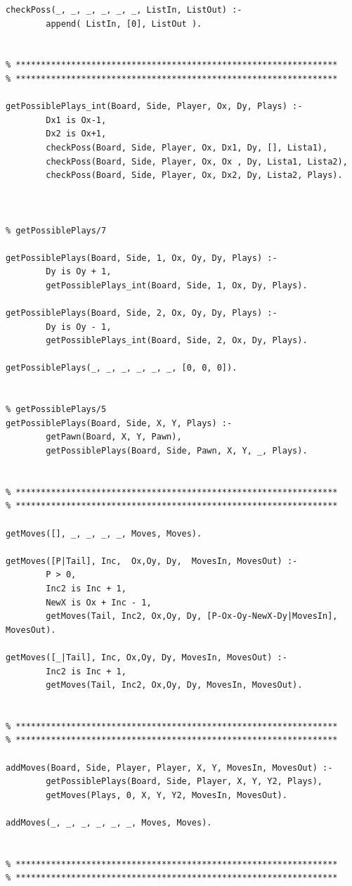 \documentclass[15pt,a4paper]{article}
\begin{document}
\begin{lstlisting}
checkPoss(_, _, _, _, _, _, ListIn, ListOut) :-
		append( ListIn, [0], ListOut ).
		

% ****************************************************************
% ****************************************************************   
		
getPossiblePlays_int(Board, Side, Player, Ox, Dy, Plays) :-
		Dx1 is Ox-1,
		Dx2 is Ox+1,
		checkPoss(Board, Side, Player, Ox, Dx1, Dy, [], Lista1),
		checkPoss(Board, Side, Player, Ox, Ox , Dy, Lista1, Lista2),
		checkPoss(Board, Side, Player, Ox, Dx2, Dy, Lista2, Plays).

		
		
% getPossiblePlays/7		

getPossiblePlays(Board, Side, 1, Ox, Oy, Dy, Plays) :-
		Dy is Oy + 1,
		getPossiblePlays_int(Board, Side, 1, Ox, Dy, Plays).
		
getPossiblePlays(Board, Side, 2, Ox, Oy, Dy, Plays) :-
		Dy is Oy - 1,
		getPossiblePlays_int(Board, Side, 2, Ox, Dy, Plays).
		
getPossiblePlays(_, _, _, _, _, _, [0, 0, 0]).
		

% getPossiblePlays/5
getPossiblePlays(Board, Side, X, Y, Plays) :-
		getPawn(Board, X, Y, Pawn),
		getPossiblePlays(Board, Side, Pawn, X, Y, _, Plays).
		

% ****************************************************************
% ****************************************************************

getMoves([], _, _, _, _, Moves, Moves).

getMoves([P|Tail], Inc,  Ox,Oy, Dy,  MovesIn, MovesOut) :-
		P > 0,
		Inc2 is Inc + 1,
		NewX is Ox + Inc - 1,
		getMoves(Tail, Inc2, Ox,Oy, Dy, [P-Ox-Oy-NewX-Dy|MovesIn], MovesOut).			

getMoves([_|Tail], Inc, Ox,Oy, Dy, MovesIn, MovesOut) :-
		Inc2 is Inc + 1,
		getMoves(Tail, Inc2, Ox,Oy, Dy, MovesIn, MovesOut).
		
		
% ****************************************************************
% ****************************************************************
	
addMoves(Board, Side, Player, Player, X, Y, MovesIn, MovesOut) :-
		getPossiblePlays(Board, Side, Player, X, Y, Y2, Plays),
		getMoves(Plays, 0, X, Y, Y2, MovesIn, MovesOut).

addMoves(_, _, _, _, _, _, Moves, Moves).		


% ****************************************************************
% ****************************************************************


\end{lstlisting}
\end{document}
